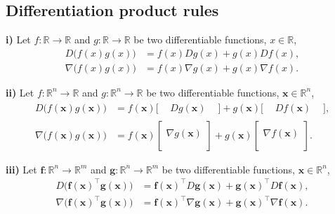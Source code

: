 \subsection{Differentiation product rules}
\textbf{i)} Let \(f: \mathbb{R} \rightarrow \mathbb{R}\) and \(g: \mathbb{R} \rightarrow \mathbb{R}\) be two differentiable functions, \(x \in \mathbb{R}\),
\[ 
\begin{aligned}
	D \bigg (f(x) g(x) \bigg )
	& = f(x)  D g(x)
	+g(x)  D f(x),  \\
	\nabla \bigg (f(x) g(x) \bigg )
	& = f(x)  \nabla g(x)
	+g(x)  \nabla f(x). 
\end{aligned}
\]

\noindent
\textbf{ii)} Let \(f: \mathbb{R}^{n} \rightarrow \mathbb{R}\) and \(g: \mathbb{R}^{n} \rightarrow \mathbb{R}\) be two differentiable functions, \(\boldsymbol{x} \in \mathbb{R}^{n}\),
\[ 
\begin{aligned}
	D \bigg (f(\boldsymbol{x}) g(\boldsymbol{x}) \bigg )
	& = f(\boldsymbol{x}) \big [\begin{array}{ccc}
		&D g(\boldsymbol{x}) & \end{array} \big ] 
	+g(\boldsymbol{x}) \big [\begin{array}{ccc} & D f(\boldsymbol{x}) &
	\end{array} \big ], \\
	\nabla \bigg (f(\boldsymbol{x}) g(\boldsymbol{x}) \bigg )
	& = f(\boldsymbol{x}) \left [\begin{array}{c}
		\\ \nabla g(\boldsymbol{x}) \\  \\ \end{array} \right ] 
	+g(\boldsymbol{x}) \left [\begin{array}{c} \\ \nabla f(\boldsymbol{x}) \\ \\
	\end{array} \right ].
\end{aligned}
\]

\noindent
\textbf{iii)} Let \( \boldsymbol{f}: \mathbb{R}^{n} \rightarrow \mathbb{R}^{m}\) and \( \boldsymbol{g}: \mathbb{R}^{n} \rightarrow \mathbb{R}^{m}\) be two differentiable functions, \(\boldsymbol{x} \in \mathbb{R}^{n}\),
\[ 
\begin{aligned}
	D \bigg (\boldsymbol{f}(\boldsymbol{x})^{\top} \boldsymbol{g}(\boldsymbol{x}) \bigg )
	& =\boldsymbol{f}(\boldsymbol{x})^{\top} D \boldsymbol{g}(\boldsymbol{x})+\boldsymbol{g}(\boldsymbol{x})^{\top} D \boldsymbol{f}(\boldsymbol{x}), \\
	\nabla \bigg (\boldsymbol{f}(\boldsymbol{x})^{\top} \boldsymbol{g}(\boldsymbol{x}) \bigg )
	& =\boldsymbol{f}(\boldsymbol{x})^{\top} \nabla \boldsymbol{g}(\boldsymbol{x})+\boldsymbol{g}(\boldsymbol{x})^{\top} \nabla \boldsymbol{f}(\boldsymbol{x}). \\
\end{aligned}
\]

